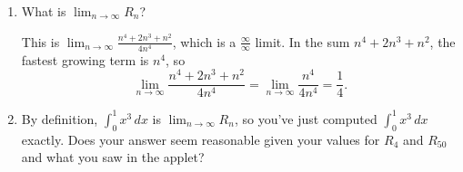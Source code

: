 \documentclass{article}
\begin{document}
\begin{enumerate}
\begin{enumerate}
    \begin{solution}
      Using the same reasoning as in
      {{{{\#8}}(a)}}, 
      \begin{align*}
        R_{n} & = \left( \frac{1}{n} \right)^3 \frac{1}{n} + \left( \frac{2}{n}
        \right)^3 \frac{1}{n} + \left( \frac{3}{n} \right)^3
        \frac{1}{n} + \cdots + \left( \frac{n-1}{n} \right)^3
        \frac{1}{n} + \left( \frac{n}{n} \right)^3 \frac{1}{n}\\
        &= \frac{1}{n^4} + \frac{2^3}{n^4} + \frac{3^3}{n^4} + \cdots +
        \frac{(n - 1)^3}{n^4} + \frac{n^3}{n^4} \\
        & = \frac{1}{n^4}\left(1^3 + 2^3 + 3^3 + \cdots + n^3  \right) \\
        & = \frac{1}{n^4}\left(\dfrac{n^4 + 2n^3 +
            n^2}{4}\right) \text{ by (*)} \\
        & = \boxed{\frac{n^4+2 n^3+n^2}{4 n^4}}
      \end{align*}
      \checkmark\
        When $n = 4$, our formula gives $R_4 = \frac{4^4 + 2 \cdot 4^3 +
          4^2}{4 \cdot 4^4} = \frac{25}{64}$.  When $n = 50$, our formula
        gives $R_{50} = \frac{50^4 + 2 \cdot 50^3 + 50^2}{4 \cdot 50^4} =
        \frac{2601}{10000}$.  These agree with our earlier answers. 

    \end{solution}

  \item
    \begin{problem}[\vfill]
      What is $\displaystyle \lim_{n \to \infty} R_n$?
    \end{problem}

    \begin{solution}
      This is $\displaystyle \lim_{n \to \infty} \frac{n^4+2 n^3+n^2}{4
        n^4}$, which is a $\frac{\infty}{\infty}$ limit.  In the sum $n^4
      + 2n^3 + n^2$, the fastest growing term is $n^4$, so
      \[ \lim_{n \to \infty} \frac{n^4+2 n^3+n^2}{4 n^4} = \lim_{n \to
        \infty} \frac{n^4}{4 n^4} = \boxed{\frac{1}{4}}.\] 
    \end{solution}

  \item
    \begin{problem}[\vfill]
      By definition, $\displaystyle \int_0^1 x^3\,dx$ is $\displaystyle
      \lim_{n \to \infty} R_n$, so you've just computed $\displaystyle
      \int_0^1 x^3\,dx$ exactly.  Does your answer seem reasonable given
      your values for $R_4$ and $R_{50}$ and what you saw in the applet?
    \end{problem}


\end{enumerate}
\end{enumerate}
\end{document}
